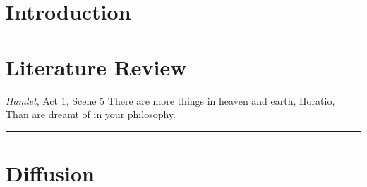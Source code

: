 \documentclass[a4paper, 12pt, twoside]{report}
\begin{document}
% 

 \pagestyle{empty}
 \setcounter{page}{1}
 
 
 \def\localpath{ThesisFrontmatter}
 
 
 \sglspace
 
 
 \tableofcontents
 \newpage
 
 \listoffigures
 \newpage
 
 \listoftables
 \newpage

 
 \newpage
 
 
 \newpage

 \setcounter{page}{0}
 \pagestyle{thesisheadings}
 
 
 \def\localpath{Intro}
 \chapter{Introduction}
 
 
 \def\localpath{LitReview}
 \chapter{Literature Review}
 \begin{aquote}{\emph{Hamlet}, Act 1, Scene 5}
  {\selectfont
   There are more things in heaven and earth, Horatio,\\
   Than are dreamt of in your philosophy.
  }
 \end{aquote}
 \rule{\linewidth}{0.25mm}
 

 
 \appendix
 
 \chapter{Diffusion}
 \def\localpath{Appendices}
 

 \sglspace

 \pagestyle{bibheadings}

 
 
\end{document}
